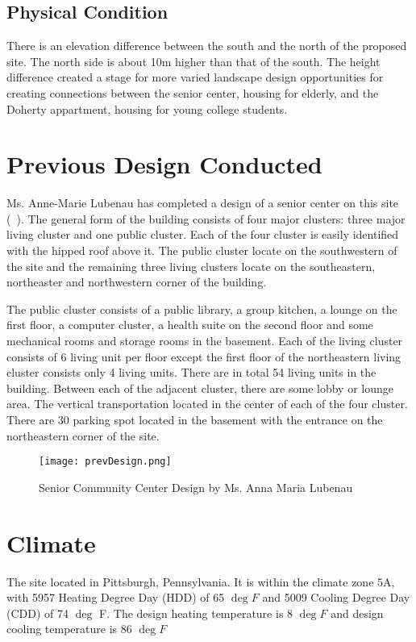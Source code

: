 \subsection{Physical Condition}
There is an elevation difference between the south and the north of
the proposed site. The north side is about 10m higher than that of the
south. The height difference created a stage for more varied landscape
design opportunities for creating connections between the senior
center, housing for elderly, and the Doherty appartment, housing for
young college students.

\section{Previous Design Conducted}
Ms. Anne-Marie Lubenau has completed a design of a senior center on
this site (~). The general form of the building
consists of four major clusters: three major living cluster and one
public cluster. Each of the four cluster is easily identified with
the hipped roof above it. The public cluster locate on the
southwestern of the site and the remaining three living clusters
locate on the southeastern, northeaster and northwestern corner of the
building.

The public cluster consists of a public library, a group kitchen, a
lounge on the first floor, a computer cluster, a health suite on the
second floor and some mechanical rooms and storage rooms in the
basement. Each of the living cluster consists of 6 living unit per
floor except the first floor of the northeastern living cluster
consists only 4 living units. There are in total 54 living units in
the building. Between each of the adjacent cluster, there are some
lobby or lounge area. The vertical transportation located in the
center of each of the four cluster. There are 30 parking spot located
in the basement with the entrance on the northeastern corner of the
site.
\begin{figure}[htbp]
  \centering
  \texttt{[image: prevDesign.png]}
  \caption[Design by Ms. Lubenau]{Senior Community Center Design by
    Ms. Anna Maria Lubenau}
  \label{fig:prevDesign}
\end{figure}
\section{Climate}
The site located in Pittsburgh, Pennsylvania. It is within the climate
zone 5A, with 5957 Heating Degree Day (HDD) of 65 $\deg F$ and 5009
Cooling Degree Day (CDD) of 74 $\deg$ F. The design heating
temperature is 8 $\deg F$ and design cooling temperature is 86
$\deg F$~\cite{remrate}


